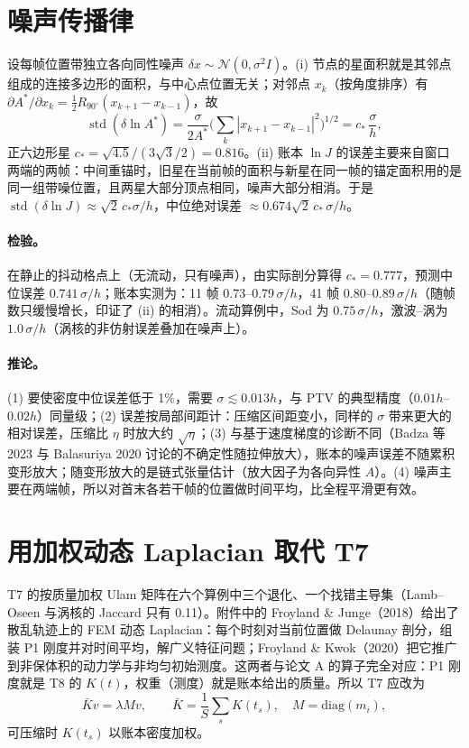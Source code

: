 \section{噪声传播律}
\begin{proposition}[账本的噪声传播]
设每帧位置带独立各向同性噪声 $\delta x\sim\mathcal N(0,\sigma^2I)$。(i) 节点的星面积就是其邻点组成的连接多边形的面积，与中心点位置无关；对邻点 $x_k$（按角度排序）有 $\partial A^\ast/\partial x_k=\tfrac12R_{90^\circ}(x_{k+1}-x_{k-1})$，故
\begin{equation}
\operatorname{std}(\delta\ln A^\ast)=\frac{\sigma}{2A^\ast}\Big(\sum_k|x_{k+1}-x_{k-1}|^2\Big)^{1/2}=c_\ast\,\frac{\sigma}{h},
\end{equation}
正六边形星 $c_\ast=\sqrt{4.5}/(3\sqrt3/2)=0.816$。(ii) 账本 $\ln J$ 的误差主要来自窗口两端的两帧：中间重锚时，旧星在当前帧的面积与新星在同一帧的锚定面积用的是同一组带噪位置，且两星大部分顶点相同，噪声大部分相消。于是 $\operatorname{std}(\delta\ln J)\approx\sqrt2\,c_\ast\sigma/h$，中位绝对误差 $\approx0.674\sqrt2\,c_\ast\,\sigma/h$。
\end{proposition}
\paragraph{检验。}在静止的抖动格点上（无流动，只有噪声），由实际剖分算得 $c_\ast=0.777$，预测中位误差 $0.741\,\sigma/h$；账本实测为：11 帧 $0.73$–$0.79\,\sigma/h$，41 帧 $0.80$–$0.89\,\sigma/h$（随帧数只缓慢增长，印证了 (ii) 的相消）。流动算例中，Sod 为 $0.75\,\sigma/h$，激波–涡为 $1.0\,\sigma/h$（涡核的非仿射误差叠加在噪声上）。

\paragraph{推论。}(1) 要使密度中位误差低于 1\%，需要 $\sigma\lesssim0.013h$，与 PTV 的典型精度（$0.01h$–$0.02h$）同量级；(2) 误差按局部间距计：压缩区间距变小，同样的 $\sigma$ 带来更大的相对误差，压缩比 $\eta$ 时放大约 $\sqrt\eta$；(3) 与基于速度梯度的诊断不同（Badza 等 2023 与 Balasuriya 2020 讨论的不确定性随拉伸放大），账本的噪声误差不随累积变形放大；随变形放大的是链式张量估计（放大因子为各向异性 $A$）。(4) 噪声主要在两端帧，所以对首末各若干帧的位置做时间平均，比全程平滑更有效。
\section{用加权动态 Laplacian 取代 T7}
T7 的按质量加权 Ulam 矩阵在六个算例中三个退化、一个找错主导集（Lamb–Oseen 与涡核的 Jaccard 只有 0.11）。附件中的 Froyland \& Junge（2018）给出了散乱轨迹上的 FEM 动态 Laplacian：每个时刻对当前位置做 Delaunay 剖分，组装 P1 刚度并对时间平均，解广义特征问题；Froyland \& Kwok（2020）把它推广到非保体积的动力学与非均匀初始测度。这两者与论文 A 的算子完全对应：P1 刚度就是 T8 的 $K(t)$，权重（测度）就是账本给出的质量。所以 T7 应改为
\begin{equation}
\bar K v=\lambda M v,\qquad \bar K=\frac1S\sum_s K(t_s),\quad M=\mathrm{diag}(m_i),
\end{equation}
可压缩时 $K(t_s)$ 以账本密度加权。
